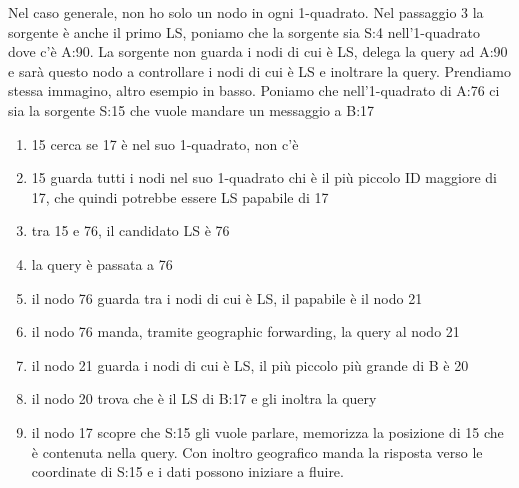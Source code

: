 \documentclass[12pt,italian]{report}
\begin{document}
\bigbreak
Nel caso generale, non ho solo un nodo in ogni 1-quadrato. Nel passaggio 3 la sorgente è anche il primo LS, poniamo che la sorgente sia S:4 nell'1-quadrato dove c'è A:90. La sorgente non guarda i nodi di cui è LS, delega la query ad A:90 e sarà questo nodo a controllare i nodi di cui è LS e inoltrare la query. 
\bigbreak
Prendiamo stessa immagino, altro esempio in basso. Poniamo che nell'1-quadrato di A:76 ci sia la sorgente S:15 che vuole mandare un messaggio a B:17
\begin{enumerate}
    \item 15 cerca se 17 è nel suo 1-quadrato, non c'è
    \item 15 guarda tutti i nodi nel suo 1-quadrato chi è il più piccolo ID maggiore di 17, che quindi potrebbe essere LS papabile di 17
    \item tra 15 e 76, il candidato LS è 76
    \item la query è passata a 76
    \item il nodo 76 guarda tra i nodi di cui è LS, il papabile è il nodo 21
    \item il nodo 76 manda, tramite geographic forwarding, la query al nodo 21
    \item il nodo 21 guarda i nodi di cui è LS, il più piccolo più grande di B è 20
    \item il nodo 20 trova che è il LS di B:17 e gli inoltra la query
    \item il nodo 17 scopre che S:15 gli vuole parlare, memorizza la posizione di 15 che è contenuta nella query. Con inoltro geografico manda la risposta verso le coordinate di S:15 e i dati possono iniziare a fluire. 
\end{enumerate}
\end{document}
